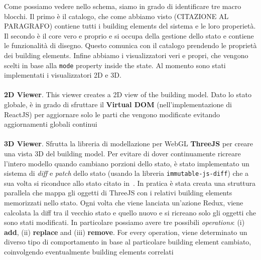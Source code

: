 Come possiamo vedere nello schema, siamo in grado di identificare tre macro blocchi. Il primo \`e il catalogo, che come abbiamo visto (CITAZIONE AL PARAGRAFO) contiene tutti i building elements del sistema e le loro properiet\`a. Il secondo \`e il core vero e proprio e si occupa della gestione dello stato e contiene le funzionalit\`a di disegno. Questo comunica con il catalogo prendendo le propriet\`a dei building elements. Infine abbiamo i visualizzatori veri e propri, che vengono scelti in base alla \texttt{mode} property inside the state. Al momento sono stati implementati i visualizzatori 2D e 3D.\\\\
\textbf{2D Viewer}. This viewer creates a 2D view of the building model. Dato lo stato globale, \`e in grado di sfruttare il \textbf{Virtual DOM} (nell'implementazione di ReactJS) per aggiornare solo le parti che vengono modificate evitando aggiornamenti globali continui\\\\
\textbf{3D Viewer}. Sfrutta la libreria di modellazione per WebGL \textbf{ThreeJS} per creare una vista 3D del building model. Per evitare di dover continuamente ricreare l'intero modello quando cambiano porzioni dello stato, \`e stato implementato un sistema di \textit{diff} e \textit{patch} dello stato (usando la libreria \texttt{immutable-js-diff}) che a sua volta si riconduce allo stato citato in~\cite{rfc6902}. In pratica \`e stata creata una struttura parallela che mappa gli oggetti di ThreeJS con i relativi building elements memorizzati nello stato. Ogni volta che viene lanciata un'azione Redux, viene calcolata la diff tra il vecchio stato e quello nuovo e si ricreano solo gli oggetti che sono stati modificati. In particolare possiamo avere tre possibili \textit{operations}: (i) \textbf{add}, (ii) \textbf{replace} and (iii) \textbf{remove}. For every operation, viene determinato un diverso tipo di comportamento in base al particolare building element cambiato, coinvolgendo eventualmente building elements correlati


